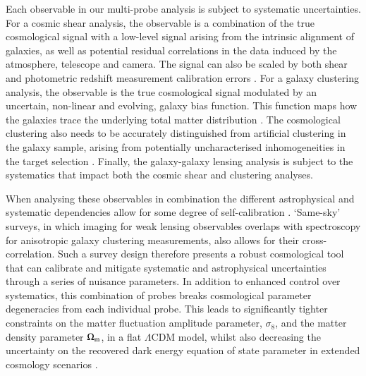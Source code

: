 Each observable in our multi-probe analysis is subject to systematic
uncertainties.  For a cosmic shear analysis, the observable is a
combination of the true cosmological signal with a low-level signal
arising from the intrinsic alignment of galaxies, as well as potential residual
correlations in the data induced by the atmosphere, telescope and
camera.   The signal can also be scaled by both shear
 and photometric redshift measurement calibration errors
 \citep[see][and references therein]{mandelbaum:2018}.   For a galaxy
   clustering analysis, the observable is the true
   cosmological signal modulated by an uncertain, non-linear and
   evolving, galaxy bias function.  This function maps how
   the galaxies trace the
   underlying total matter distribution \citep[see][and references
   therein]{desjacques/etal:2018}. 
   The cosmological clustering
   also needs to be accurately distinguished from artificial clustering in the galaxy sample,
   arising from potentially uncharacterised inhomogeneities in the target selection \citep[see for example][]{ross/etal:2012}. 
   Finally, the galaxy-galaxy
   lensing analysis is subject to the systematics that impact both the
   cosmic shear and clustering analyses.

   When analysing these
   observables in combination
   the different astrophysical and systematic dependencies allow for some degree of
   self-calibration \citep{bernstein/jain:2004, hu/jain:2004,
     bernstein:2009,joachimi/bridle:2010}.  `Same-sky'
   surveys, in which imaging for weak lensing observables overlaps with
   spectroscopy for anisotropic galaxy clustering measurements,
   also allows for their cross-correlation.  Such a survey design therefore
   presents a robust
   cosmological tool that can calibrate and mitigate systematic and astrophysical
   uncertainties through a series of nuisance parameters.   In
   addition to enhanced control over systematics, this combination of probes
   breaks cosmological parameter degeneracies from each individual
   probe. 
   This leads to significantly tighter constraints on the matter fluctuation amplitude 
   parameter, $\sigma_8$, and the matter density parameter $\Omega_{\rm m}$, in a flat $\Lambda$CDM model, whilst also decreasing the
   uncertainty on the recovered dark energy equation of state
   parameter in extended cosmology scenarios \citep{hu/jain:2004,gaztanaga/etal:2012}.
   

